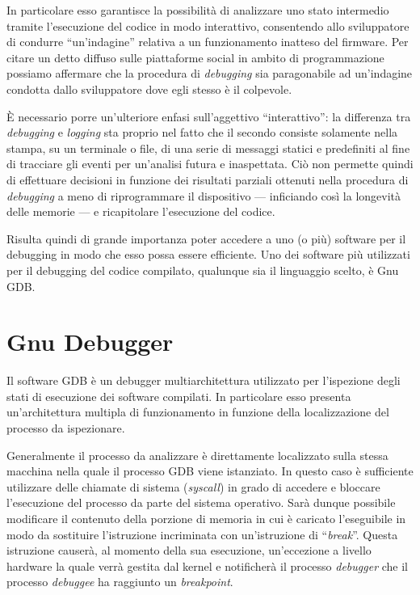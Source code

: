 In particolare esso garantisce la possibilità di analizzare uno stato intermedio tramite l'esecuzione del codice in modo interattivo, consentendo allo sviluppatore di condurre ``un'indagine'' relativa a un funzionamento inatteso del firmware. Per citare un detto diffuso sulle piattaforme social in ambito di programmazione possiamo affermare che la procedura di \textit{debugging} sia paragonabile ad un'indagine condotta dallo sviluppatore dove egli stesso è il colpevole.

È necessario porre un'ulteriore enfasi sull'aggettivo ``interattivo'': la differenza tra \textit{debugging} e \textit{logging} sta proprio nel fatto che il secondo consiste solamente nella stampa, su un terminale o file, di una serie di messaggi statici e predefiniti al fine di tracciare gli eventi per un'analisi futura e inaspettata. Ciò non permette quindi di effettuare decisioni in funzione dei risultati parziali ottenuti nella procedura di \textit{debugging} a meno di riprogrammare il dispositivo --- inficiando così la longevità delle memorie --- e ricapitolare l'esecuzione del codice.

Risulta quindi di grande importanza poter accedere a uno (o più) software per il debugging in modo che esso possa essere efficiente.
Uno dei software più utilizzati per il debugging del codice compilato, qualunque sia il linguaggio scelto, è Gnu GDB\cite{site:gdb}.

\section{Gnu Debugger}\label{sec:gdb}

Il software GDB è un debugger multiarchitettura\cite{site:gdb} utilizzato per l'ispezione degli stati di esecuzione dei software compilati.
In particolare esso presenta un'architettura multipla di funzionamento in funzione della localizzazione del processo da ispezionare.

Generalmente il processo da analizzare è direttamente localizzato sulla stessa macchina nella quale il processo GDB viene istanziato. In questo caso è sufficiente utilizzare delle chiamate di sistema (\textit{syscall}) in grado di accedere e bloccare l'esecuzione del processo da parte del sistema operativo.
Sarà dunque possibile modificare il contenuto della porzione di memoria in cui è caricato l'eseguibile in modo da sostituire l'istruzione incriminata con un'istruzione di ``\textit{break}''. Questa istruzione causerà, al momento della sua esecuzione, un'eccezione a livello hardware la quale verrà gestita dal kernel e notificherà il processo \textit{debugger} che il processo \textit{debuggee} ha raggiunto un \textit{breakpoint}.

